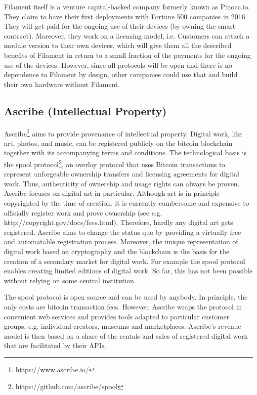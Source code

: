Filament itself is a venture capital-backed company formerly known as Pinocc.io. 
They claim to have their first deployments with Fortune 500 companies in 2016. 
They will get paid for the ongoing use of their devices (by owning the smart contract). 
Moreover, they work on a licensing model, i.e. Customers can attach a module version 
to their own devices, which will give them all the described benefits of Filament 
in return to a small fraction of the payments for the ongoing use of the devices. 
However, since all protocols will be open and there is no dependence to Filament 
by design, other companies could use that and build their own hardware without 
Filament.

\subsection{Ascribe (Intellectual Property)}
\label{sec:ecoascribe}

Ascribe\footnote{https://www.ascribe.io/} aims to provide provenance of intellectual property. Digital work, 
like art, photos, and music, can be registered publicly on the bitcoin blockchain 
together with its accompanying terms and conditions. The technological basis is 
the spool protocol\footnote{https://github.com/ascribe/spool}, an overlay protocol that uses 
Bitcoin transactions to represent unforgeable ownership transfers and licensing 
agreements for digital work. Thus, authenticity of ownership and usage rights can 
always be proven. Ascribe focuses on digital art in particular. Although art is 
in principle copyrighted by the time of creation, it is currently cumbersome and 
expensive to officially register work and prove ownership (see e.g. http://copyright.gov/docs/fees.html). 
Therefore, hardly any digital art gets registered. Ascribe aims to change the status 
quo by providing a virtually free and automatable registration process. Moreover, 
the unique representation of digital work based on cryptography and the blockchain 
is the basis for the creation of a secondary market for digital work. For example 
the spool protocol enables creating limited editions of digital work. So far, this 
has not been possible without relying on some central institution.

The spool protocol is open source and can be used by anybody. In principle, the 
only costs are bitcoin transaction fees. However, Ascribe wraps the protocol in 
convenient web services and provides tools adapted to particular customer groups, 
e.g. individual creators, museums and marketplaces. Ascribe's revenue model is 
then based on a share of the rentals and sales of registered digital work that 
are facilitated by their APIs.

